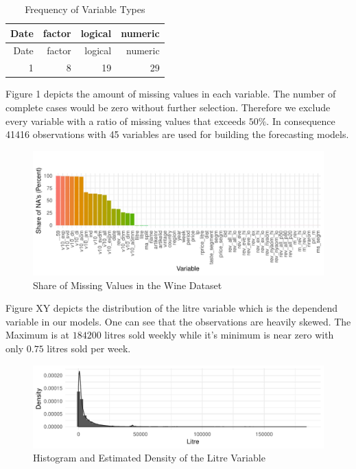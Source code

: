 \documentclass[11pt,]{article}
\begin{document}
\begin{longtable}[]{@{}rrrr@{}}
\caption{Frequency of Variable Types}\tabularnewline
\toprule
Date & factor & logical & numeric\tabularnewline
\midrule
\endfirsthead
\toprule
Date & factor & logical & numeric\tabularnewline
\midrule
\endhead
1 & 8 & 19 & 29\tabularnewline
\bottomrule
\end{longtable}

Figure 1 depicts the amount of missing values in each variable. The
number of complete cases would be zero without further selection.
Therefore we exclude every variable with a ratio of missing values that
exceeds \(50\%\). In consequence 41416 observations with 45 variables
are used for building the forecasting models.

\begin{figure}
\centering
\includegraphics{../00_data/output_paper/02_missings_alt.pdf}
\caption{Share of Missing Values in the Wine Dataset}
\end{figure}

Figure XY depicts the distribution of the litre variable which is the
dependend variable in our models. One can see that the observations are
heavily skewed. The Maximum is at \(184200\) litres sold weekly while
it's minimum is near zero with only \(0.75\) litres sold per week.

\begin{figure}
\centering
\includegraphics{../00_data/output_paper/04_hist_litre.pdf}
\caption{Histogram and Estimated Density of the Litre Variable}
\end{figure}
\end{document}
